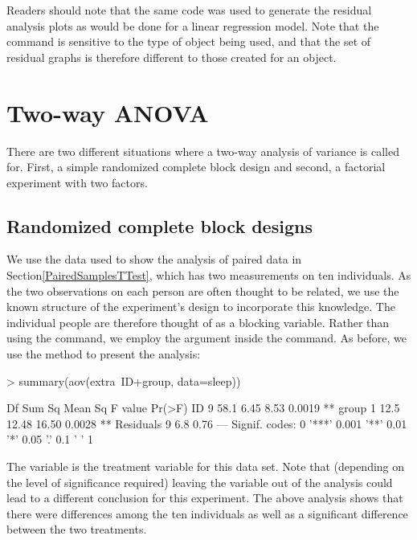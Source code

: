 Readers should note that the same code was used to generate the residual analysis plots as would be done for a linear regression model. Note that the  command is sensitive to the type of object being used, and that the set of residual graphs is therefore different to those created for an  object. 
 
\section{Two-way ANOVA} 
 
There are two different situations where a two-way analysis of variance is called for. First, a simple randomized complete block design and second, a factorial experiment with two factors. 
 
\subsection{Randomized complete block designs} 
\label{RCBAnalysis} 
 
We use the  data used to show the analysis of paired data in Section\ref{PairedSamplesTTest}, which has two measurements on ten individuals. As the two observations on each person are often thought to be related, we use the known structure of the experiment's design to incorporate this knowledge. The individual people are therefore thought of as a blocking variable. Rather than using the  command, we employ the  argument inside the  command. As before, we use the  method to present the analysis: 
\begin{Schunk}
\begin{Sinput}
> summary(aov(extra~ID+group, data=sleep)) 
\end{Sinput}
\begin{Soutput}
            Df Sum Sq Mean Sq F value Pr(>F)   
ID           9   58.1    6.45    8.53 0.0019 **
group        1   12.5   12.48   16.50 0.0028 **
Residuals    9    6.8    0.76                  
---
Signif. codes:  
0 '***' 0.001 '**' 0.01 '*' 0.05 '.' 0.1 ' ' 1
\end{Soutput}
\end{Schunk}
 
The  variable is the treatment variable for this data set. Note that (depending on the level of significance required) leaving the  variable out of the analysis could lead to a different conclusion for this experiment. The above analysis shows that there were differences among the ten individuals as well as a significant difference between the two treatments. 
 
